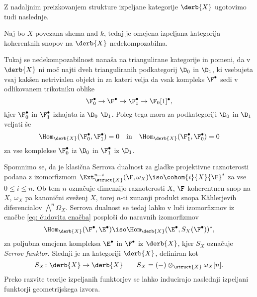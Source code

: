 Z nadaljnim preizkovanjem strukture izpeljane kategorije $\derb{X}$ ugotovimo tudi naslednje.

\begin{izrek}
    \emph{\cite[\S 3, Proposition 3.10]{huybrechts2006fouriermukai}}
    Naj bo $X$ povezana shema nad $k$, tedaj je omejena izpeljana kategorija koherentnih snopov na $\derb{X}$ nedekompozabilna. 
\end{izrek}

Tukaj se nedekompozabilnost nanaša na triangulirane kategorije in pomeni, da v $\derb{X}$ ni moč najti dveh trianguliranih podkategorij $\D_0$ in $\D_1$, ki vsebujeta vsaj kakšen netrivialen objekt in za kateri velja da vsak kompleks $\F^\bullet$ sedi v odlikovanem trikotniku oblike 
\[
    \F_0^\bullet \to \F^\bullet \to \F_1^\bullet \to \F_0[1]^\bullet,
\]
kjer $\F_0^\bullet$ in $\F_1^\bullet$ izhajata iz $\D_0$ \oz $\D_1$. Poleg tega mora za podkategoriji $\D_0$ in $\D_1$ veljati še 
\begin{equation*}
    \Hom_{\derb{X}}(\F_0^\bullet, \F_1^\bullet) = 0 \quad \text{in} \quad 
    \Hom_{\derb{X}}(\F_1^\bullet, \F_0^\bullet) = 0
\end{equation*}  
za vse komplekse $\F_0^\bullet$ iz $\D_0$ in $\F_1^\bullet$ iz $\D_1$.

Spomnimo se, da je klasična Serrova dualnost za gladke projektivne raznoterosti podana z izomorfizmom $\Ext_{\struct{X}}^{n-i}(\F, \omega_X) \iso \cohom{i}{X}{\F}^*$ za vse $0 \leq i \leq n$. Ob tem $n$ označuje dimenzijo raznoterosti $X$, $\F$ koherentnen snop na $X$, $\omega_X$ pa kanonični sveženj $X$, torej $n$-ti zunanji produkt snopa Kählerjevih diferencialov $\bigwedge^n \Omega_X$. Serrova dualnost se tedaj lahko v luči izomorfizmov iz enačbe \eqref{eq: čudovita enačba} posploši do naravnih izomorfizmov 
\[
    \Hom_{\derb{X}}(\F^\bullet, \E^\bullet) \iso \Hom_{\derb{X}}(\E^\bullet, S_X(\F^\bullet))^*,  
\]
za poljubna omejena kompleksa $\E^\bullet$ in $\F^\bullet$ iz $\derb{X}$, kjer $S_X$ označuje \ti \emph{Serrov funktor}. Slednji je na kategoriji $\derb{X}$, definiran kot 
\[
    S_X \colon \derb{X} \to \derb{X} \qquad S_X = (-) \otimes_{\struct{X}} \omega_X[n].
\]
Preko razvite teorije izpeljanih funktorjev se lahko inducirajo naslednji izpeljani funktorji geometrijskega izvora. 

